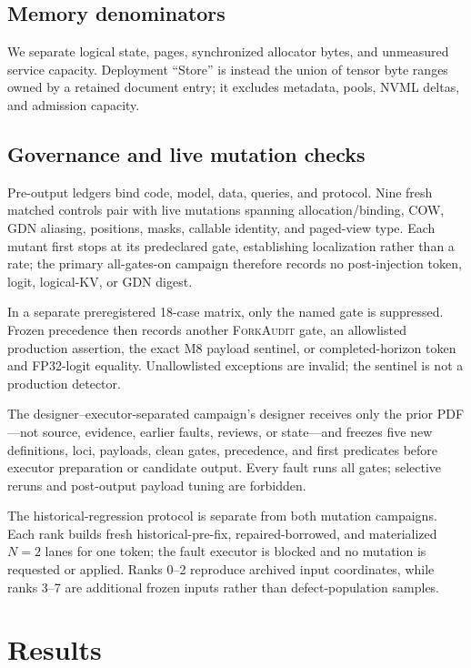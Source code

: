 \documentclass{article}
\newcommand{\method}{\textsc{ForkAudit}}
\begin{document}
\subsection{Memory denominators}
\label{sec:denominators}

We separate logical state, pages, synchronized allocator bytes, and unmeasured
service capacity.  Deployment ``Store'' is instead the union of tensor byte
ranges owned by a retained document entry; it excludes metadata, pools, NVML
deltas, and admission capacity.

\subsection{Governance and live mutation checks}

Pre-output ledgers bind code, model, data, queries, and protocol.  Nine fresh
matched controls pair with live mutations spanning allocation/binding, COW,
GDN aliasing, positions, masks, callable identity, and paged-view type.  Each
mutant first stops at its predeclared gate, establishing localization rather
than a rate; the primary all-gates-on campaign therefore records no
post-injection token, logit, logical-KV, or GDN digest.

In a separate preregistered 18-case matrix, only the named gate is suppressed.
Frozen precedence then records another \method{} gate, an allowlisted
production assertion, the exact M8 payload sentinel, or completed-horizon
token and FP32-logit equality.  Unallowlisted exceptions are invalid; the
sentinel is not a production detector.

The designer--executor-separated campaign's designer receives only the prior PDF---not
source, evidence, earlier faults, reviews, or state---and freezes five new
definitions, loci, payloads, clean gates, precedence, and first predicates
before executor preparation or candidate output.  Every fault runs all gates;
selective reruns and post-output payload tuning are forbidden.

The historical-regression protocol is separate from both mutation campaigns.
Each rank builds fresh historical-pre-fix, repaired-borrowed, and materialized
$N=2$ lanes for one token; the fault executor is blocked and no mutation is
requested or applied.  Ranks 0--2 reproduce archived input coordinates, while
ranks 3--7 are additional frozen inputs rather than defect-population samples.

\section{Results}
\label{sec:results}
\end{document}
